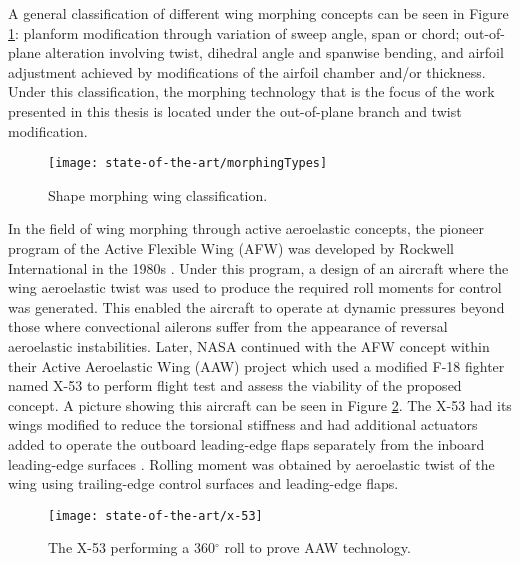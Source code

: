   A general classification of different wing morphing concepts can be seen in Figure \ref{fig:morphingTypes}: planform modification through variation of sweep angle, span or chord; out-of-plane alteration involving twist, dihedral angle and spanwise bending, and airfoil adjustment achieved by modifications of the airfoil chamber and/or thickness. Under this classification, the morphing technology that is the focus of the work presented in this thesis is located under the out-of-plane branch and twist modification.

  \begin{figure}[!htpb]
    \centering
    \texttt{[image: state-of-the-art/morphingTypes]}
    \caption[Shape morphing wing classification]{Shape morphing wing classification. \cite{Barbarino2011}}\label{fig:morphingTypes}
  \end{figure}

  In the field of wing morphing through active aeroelastic concepts, the pioneer program of the Active Flexible Wing (AFW) was developed by Rockwell International in the 1980s \cite{Rockwell}. Under this program, a design of an aircraft where the wing aeroelastic twist was used to produce the required roll moments for control was generated. This enabled the aircraft to operate at dynamic pressures beyond those where convectional ailerons suffer from the appearance of reversal aeroelastic instabilities. Later, NASA continued with the AFW concept within their Active Aeroelastic Wing (AAW) project which used a modified F-18 fighter named X-53 to perform flight test and assess the viability of the proposed concept. A picture showing this aircraft can be seen in Figure \ref{fig:x-53}. The X-53 had its wings modified to reduce the torsional stiffness and had additional actuators added to operate the outboard leading-edge flaps separately from the inboard leading-edge surfaces \cite{NASA}. Rolling moment was obtained by aeroelastic twist of the wing using trailing-edge control surfaces and leading-edge flaps.

  \begin{figure}[!htpb]
    \centering
    \texttt{[image: state-of-the-art/x-53]}
    \caption[The X-53 performing a 360$^{\circ}$ roll to prove AAW technology]{The X-53 performing a 360$^{\circ}$ roll to prove AAW technology. \cite{NASA}}\label{fig:x-53}
  \end{figure}

